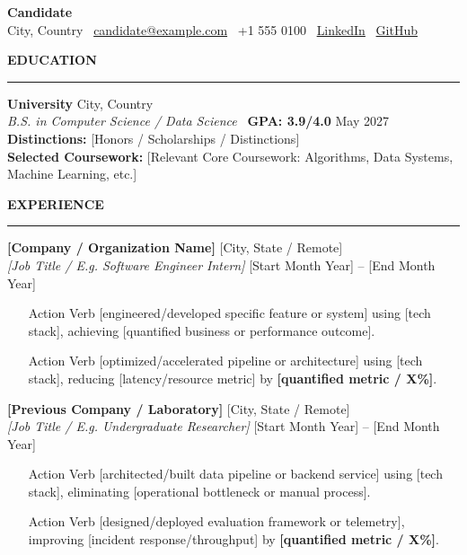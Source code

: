 \documentclass[10pt,letterpaper]{article}
\newcommand{\cvsection}[1]{%
  \vspace{3.5pt}%
  {\small\textbf{\MakeUppercase{#1}}}\\[-3.5pt]%
  \rule{\textwidth}{0.4pt}\par\vspace{2pt}%
}
\begin{document}
\begin{center}
    {\LARGE \textbf{Candidate}}\\[2pt]
    \small City, Country \textbullet\ \href{mailto:candidate@example.com}{candidate@example.com} \textbullet\ +1 555 0100 \textbullet\ \href{https://linkedin.com/in/username}{LinkedIn} \textbullet\ \href{https://github.com/username}{GitHub}
\end{center}
\vspace{-6pt}

\cvsection{Education}
\textbf{University} \hfill City, Country\\
\textit{B.S. in Computer Science / Data Science} \textbullet\ \textbf{GPA: 3.9/4.0} \hfill May 2027\\
\textbf{Distinctions:} [Honors / Scholarships / Distinctions]\\
\textbf{Selected Coursework:} [Relevant Core Coursework: Algorithms, Data Systems, Machine Learning, etc.]

\cvsection{Experience}

\textbf{[Company / Organization Name]} \hfill [City, State / Remote]\\
\textit{[Job Title / E.g. Software Engineer Intern]} \hfill [Start Month Year] -- [End Month Year]
\begin{itemize}
    \item [Action Verb] [engineered/developed specific feature or system] using [tech stack], achieving [quantified business or performance outcome].
    \item [Action Verb] [optimized/accelerated pipeline or architecture] using [tech stack], reducing [latency/resource metric] by \textbf{[quantified metric / X\%]}.
\end{itemize}

\vspace{2pt}
\textbf{[Previous Company / Laboratory]} \hfill [City, State / Remote]\\
\textit{[Job Title / E.g. Undergraduate Researcher]} \hfill [Start Month Year] -- [End Month Year]
\begin{itemize}
    \item [Action Verb] [architected/built data pipeline or backend service] using [tech stack], eliminating [operational bottleneck or manual process].
    \item [Action Verb] [designed/deployed evaluation framework or telemetry], improving [incident response/throughput] by \textbf{[quantified metric / X\%]}.
\end{itemize}
\end{document}
